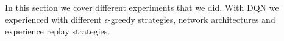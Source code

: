 In this section we cover different experiments that we did. With DQN we experienced with different $\epsilon$-greedy strategies, network architectures and experience replay strategies.
